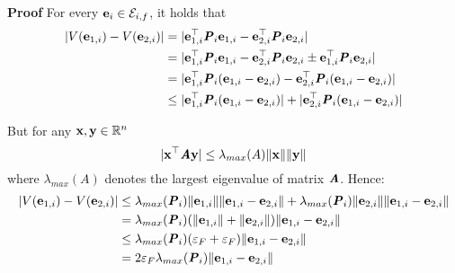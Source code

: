 \begin{gg_box}
\textbf{Proof} For every $\bm{\mathbf{e}}_i \in \mathcal{E}_{i,f}$, it holds that
\begin{align}
  |V(\bm{\mathbf{e}}_{1,i}) - V(\bm{\mathbf{e}}_{2,i})| &= |\bm{\mathbf{e}}_{1,i}^{\top} \bm{\mathit{P}}_i \bm{\mathbf{e}}_{1,i} - \bm{\mathbf{e}}_{2,i}^{\top} \bm{\mathit{P}}_i \bm{\mathbf{e}}_{2,i}| \\
    &= |\bm{\mathbf{e}}_{1,i}^{\top} \bm{\mathit{P}}_i \bm{\mathbf{e}}_{1,i} - \bm{\mathbf{e}}_{2,i}^{\top} \bm{\mathit{P}}_i \bm{\mathbf{e}}_{2,i} \pm \bm{\mathbf{e}}_{1,i}^{\top} \bm{\mathit{P}}_i \bm{\mathbf{e}}_{2,i}| \\
    &= |\bm{\mathbf{e}}_{1,i}^{\top} \bm{\mathit{P}}_i (\bm{\mathbf{e}}_{1,i}-\bm{\mathbf{e}}_{2,i}) - \bm{\mathbf{e}}_{2,i}^{\top} \bm{\mathit{P}}_i (\bm{\mathbf{e}}_{1,i}-\bm{\mathbf{e}}_{2,i})| \\
    &\leq |\bm{\mathbf{e}}_{1,i}^{\top} \bm{\mathit{P}}_i (\bm{\mathbf{e}}_{1,i}-\bm{\mathbf{e}}_{2,i})| + |\bm{\mathbf{e}}_{2,i}^{\top} \bm{\mathit{P}}_i (\bm{\mathbf{e}}_{1,i}-\bm{\mathbf{e}}_{2,i})|
\end{align}

But for any $\bm{\mathbf{x}}, \bm{\mathbf{y}} \in \mathbb{R}^n$
$$|\bm{\mathbf{x}}^{\top} \bm{\mathit{A}} \bm{\mathbf{y}}| \leq \lambda_{max}(A) \|\bm{\mathbf{x}}\| \|\bm{\mathbf{y}}\|$$
where $\lambda_{max}(A)$ denotes the largest eigenvalue of matrix $\bm{\mathit{A}}$.
Hence:
\begin{align}
  |V(\bm{\mathbf{e}}_{1,i}) - V(\bm{\mathbf{e}}_{2,i})| &\leq
  \lambda_{max}(\bm{\mathit{P}}_i) \|\bm{\mathbf{e}}_{1,i}\| \|\bm{\mathbf{e}}_{1,i} - \bm{\mathbf{e}}_{2,i}\| +
  \lambda_{max}(\bm{\mathit{P}}_i) \|\bm{\mathbf{e}}_{2,i}\| \|\bm{\mathbf{e}}_{1,i} - \bm{\mathbf{e}}_{2,i}\| \\
  &= \lambda_{max}(\bm{\mathit{P}}_i) (\|\bm{\mathbf{e}}_{1,i}\| + \|\bm{\mathbf{e}}_{2,i}\|)\|\bm{\mathbf{e}}_{1,i} - \bm{\mathbf{e}}_{2,i}\| \\
  & \leq \lambda_{max}(\bm{\mathit{P}}_i) (\varepsilon_F + \varepsilon_F)\|\bm{\mathbf{e}}_{1,i} - \bm{\mathbf{e}}_{2,i}\| \\
  &= 2 \varepsilon_F \lambda_{max}(\bm{\mathit{P}}_i) \|\bm{\mathbf{e}}_{1,i} - \bm{\mathbf{e}}_{2,i}\|
\end{align}
\qedsymbol
\end{gg_box}


